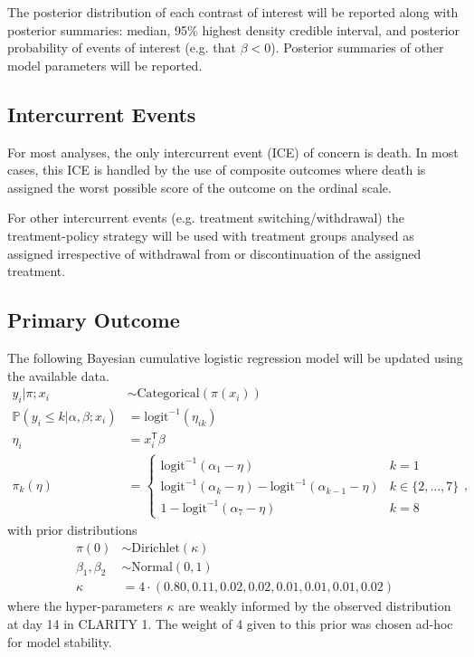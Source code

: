 \documentclass[11pt,parskip=half-]{scrartcl}
\begin{document}
The posterior distribution of each contrast of interest will be reported along with posterior summaries: median, 95\% highest density credible interval, and posterior probability of events of interest (e.g. that $\beta < 0$). Posterior summaries of other model parameters will be reported.

\subsection{Intercurrent Events}

For most analyses, the only intercurrent event (ICE) of concern is death. In most cases, this ICE is handled by the use of composite outcomes where death is assigned the worst possible score of the outcome on the ordinal scale.

For other intercurrent events (e.g. treatment switching/withdrawal) the treatment-policy strategy will be used with treatment groups analysed as assigned irrespective of withdrawal from or discontinuation of the assigned treatment.

\subsection{Primary Outcome}\label{sec:primary-outcome-analysis}
The following Bayesian cumulative logistic regression model will be updated using the available data.
$$
    \begin{aligned}
        y_{i} | \pi;x_i                            & \sim \text{Categorical}(\pi(x_i))                              \\
        \mathbb P(y_i \leq k | \alpha, \beta; x_i) & = \text{logit}^{-1}(\eta_{ik})                                 \\
        \eta_{i}                                   & = x_i^{\mathsf{T}}\beta \\
        \pi_k(\eta)                                & = \begin{cases}
            \text{logit}^{-1}(\alpha_1 - \eta)                                            & k=1             \\
            \text{logit}^{-1}(\alpha_{k} - \eta) - \text{logit}^{-1}(\alpha_{k-1} - \eta) & k\in\{2,...,7\} \\
            1 - \text{logit}^{-1}(\alpha_{7} - \eta)                                      & k=8
        \end{cases},
    \end{aligned}
$$
with prior distributions
$$
    \begin{aligned}
        \pi(0)          & \sim \text{Dirichlet}(\kappa)                            \\
        \beta_1,\beta_2 & \sim \text{Normal}(0, 1)                                 \\
        \kappa          & = 4\cdot(0.80, 0.11, 0.02, 0.02, 0.01, 0.01, 0.01, 0.02)
    \end{aligned}
$$
where the hyper-parameters $\kappa$ are weakly informed by the observed distribution at day 14 in CLARITY 1. The weight of 4 given to this prior was chosen ad-hoc for model stability.
\end{document}
